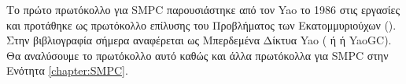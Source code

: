 Το πρώτο πρωτόκολλο για SMPC παρουσιάστηκε από τον Yao το 1986 στις εργασίες \cite{4568207} \cite{4568388} και προτάθηκε ως πρωτόκολλο επίλυσης του Προβλήματος των Εκατομμυριούχων (). Στην βιβλιογραφία σήμερα αναφέρεται ως Μπερδεμένα Δίκτυα Yao ( ή  ή YaoGC). Θα αναλύσουμε το πρωτόκολλο αυτό καθώς και άλλα πρωτόκολλα για SMPC στην Ενότητα \ref{chapter:SMPC}.
